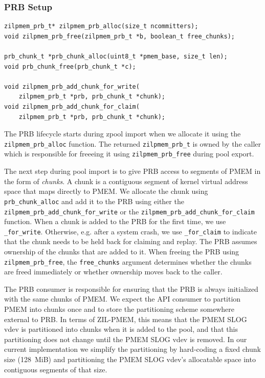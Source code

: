 \documentclass[12pt,a4paper,twoside]{book}
\begin{document}
\subsubsection{PRB Setup}\label{di:prb:api:setup}

\begin{lstlisting}
zilpmem_prb_t* zilpmem_prb_alloc(size_t ncommitters);
void zilpmem_prb_free(zilpmem_prb_t *b, boolean_t free_chunks);

prb_chunk_t *prb_chunk_alloc(uint8_t *pmem_base, size_t len);
void prb_chunk_free(prb_chunk_t *c);

void zilpmem_prb_add_chunk_for_write(
    zilpmem_prb_t *prb, prb_chunk_t *chunk);
void zilpmem_prb_add_chunk_for_claim(
    zilpmem_prb_t *prb, prb_chunk_t *chunk);
\end{lstlisting}

The PRB lifecycle starts during zpool import when we allocate it using the \lstinline{zilpmem_prb_alloc} function.
The returned \lstinline{zilpmem_prb_t} is owned by the caller which is responsible for freeeing it using \lstinline{zilpmem_prb_free} during pool export.

The next step during pool import is to give PRB access to segments of PMEM in the form of \textit{chunks}.
A chunk is a contiguous segment of kernel virtual address space that maps directly to PMEM.
We allocate the chunk using \lstinline{prb_chunk_alloc} and add it to the PRB using either the \lstinline{zilpmem_prb_add_chunk_for_write} or the \lstinline{zilpmem_prb_add_chunk_for_claim} function.
When a chunk is added to the PRB for the first time, we use \lstinline{_for_write}.
Otherwise, e.g. after a system crash, we use \lstinline{_for_claim} to indicate that the chunk needs to be held back for claiming and replay.
The PRB assumes ownership of the chunks that are added to it.
When freeing the PRB using \lstinline{zilpmem_prb_free}, the \lstinline{free_chunks} argument determines whether the chunks are freed immediately or whether ownership moves back to the caller.

The PRB consumer is responsible for ensuring that the PRB is always initialized with the same chunks of PMEM.
We expect the API consumer to partition PMEM into chunks once and to store the partitioning scheme somewhere external to PRB.
In terms of ZIL-PMEM, this means that the PMEM SLOG vdev is partitioned into chunks when it is added to the pool, and that this partitioning does not change until the PMEM SLOG vdev is removed.
In our current implementation we simplify the partitioning by hard-coding a fixed chunk size (\SI{128}{MiB}) and partitioning the PMEM SLOG vdev's allocatable space into contiguous segments of that size.
\end{document}
